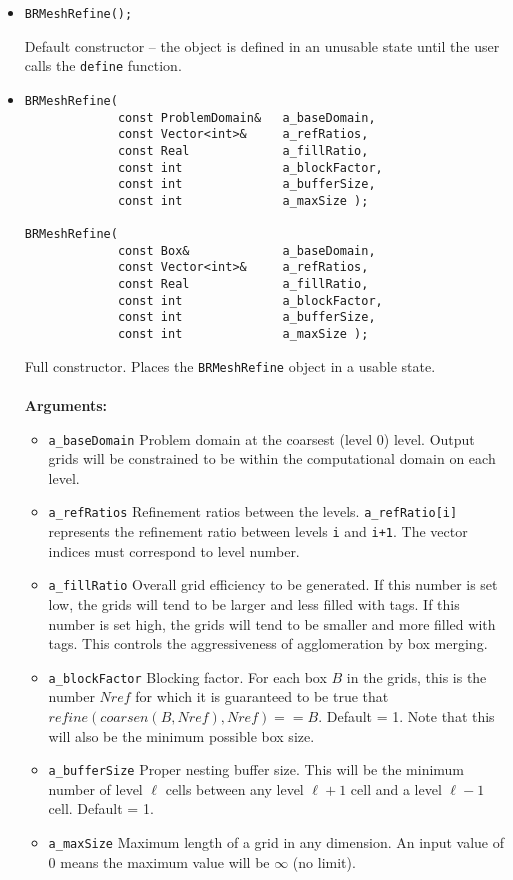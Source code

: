 \begin{itemize}
\item
\begin{verbatim}
BRMeshRefine();
\end{verbatim}
Default constructor -- the object is defined in an unusable state
until the user calls the {\tt define} function.

\item
\begin{verbatim}
BRMeshRefine(
             const ProblemDomain&   a_baseDomain,
             const Vector<int>&     a_refRatios,    
             const Real             a_fillRatio,   
             const int              a_blockFactor, 
             const int              a_bufferSize,  
             const int              a_maxSize );

BRMeshRefine(
             const Box&             a_baseDomain,
             const Vector<int>&     a_refRatios,    
             const Real             a_fillRatio,   
             const int              a_blockFactor, 
             const int              a_bufferSize,  
             const int              a_maxSize );
\end{verbatim}
Full constructor.  Places the {\tt BRMeshRefine} object in a usable
state. \\
\\
{\bf Arguments:} 
\begin{itemize} 
\item  \verb/a_baseDomain/ Problem domain at the coarsest (level 0)
        level. Output grids will be constrained to be within the
	computational domain on each level.
\item \verb/a_refRatios/ Refinement ratios between the levels.  
        \verb/a_refRatio[i]/ represents the refinement ratio between
        levels {\tt i} and {\tt i+1}.
        The vector indices must correspond to level number.
\item \verb/a_fillRatio/ Overall grid efficiency to be generated.
        If this number is set low, the grids will tend to be
        larger and less filled with tags.  If this number is set high,
        the grids will tend to be smaller and more filled with tags.
        This controls the aggressiveness of agglomeration by
        box merging.
\item \verb/a_blockFactor/ Blocking factor.  For each box $B$ in
        the grids, this is the number $Nref$ 
        for which it is guaranteed to be true that 
        $refine(coarsen(B,Nref),Nref) == B$. Default = 1.
	Note that this will also be the minimum possible
	box size.
\item \verb/a_bufferSize/  Proper nesting buffer size.  This will be the 
	minimum number of level $\ell$ cells between any level
	$\ell+1$ cell and a level $\ell-1$ cell.  Default = 1.
\item \verb/a_maxSize/  Maximum length of a grid in any
	dimension. An input value of 0 means the maximum value will
	be $\infty$ (no limit).
\end{itemize}


\end{itemize}
